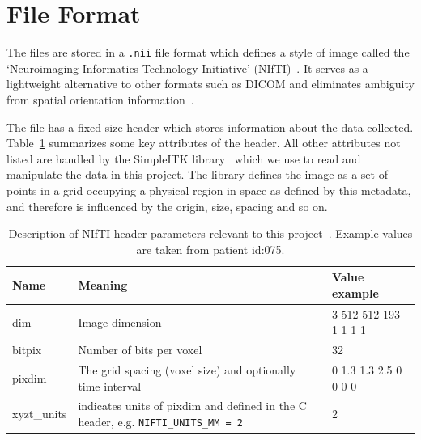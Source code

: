 \documentclass[11pt,twoside]{report}
\begin{document}
\section{File Format}\label{sec:data-file-format}

The files are stored in a \texttt{.nii} file format which defines a style of image called the `Neuroimaging Informatics Technology Initiative' (NIfTI)~\cite{file-formats}. It serves as a lightweight alternative to other formats such as DICOM and eliminates ambiguity from spatial orientation information~\cite{dicom-to-nifti-conversion}.

The file has a fixed-size header which stores information about the data collected. Table~\ref{tab:nifti-header} summarizes some key attributes of the header. All other attributes not listed are handled by the SimpleITK library~\cite{SimpleITK-paper} which we use to read and manipulate the data in this project. The library defines the image as a set of points in a grid occupying a physical region in space as defined by this metadata, and therefore is influenced by the origin, size, spacing and so on.

\begin{table}[ht]
  \centering
  \begin{tabular}{>{\raggedright}p{1.5cm}p{8cm}p{4cm}}
    \toprule
    \textbf{Name} & \textbf{Meaning}                                                                          & \textbf{Value example} \\
    \midrule
    dim           & Image dimension                                                                           & 3 512 512 193 1 1 1 1  \\
    bitpix        & Number of bits per voxel                                                                  & 32                     \\
    pixdim        & The grid spacing (voxel size) and optionally time interval                                & 0 1.3 1.3 2.5 0 0 0 0  \\
    xyzt\_units   & indicates units of pixdim and defined in the C header, e.g. \texttt{NIFTI\_UNITS\_MM = 2} & 2                      \\
    \bottomrule
  \end{tabular}
  \caption{Description of NIfTI header parameters relevant to this project~\cite{dicom-to-nifti-conversion, nifti-headers, nifti-data-format}. Example values are taken from patient id:075.}
 \label{tab:nifti-header}
\end{table}
\end{document}
